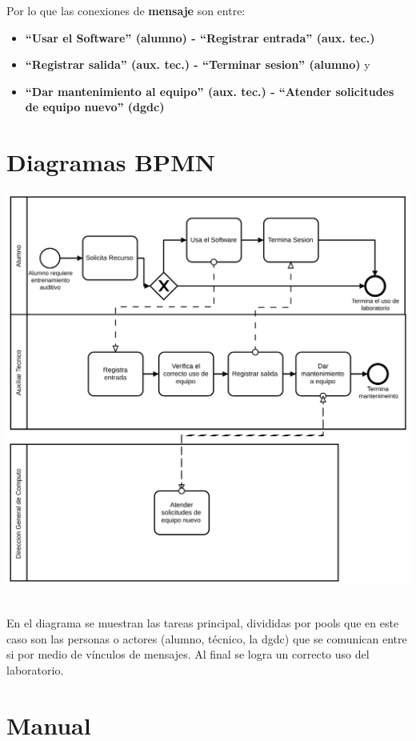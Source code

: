 \documentclass[spanish,12pt,letterpapper]{article}
\begin{document}
	Por lo que las conexiones de \textbf{mensaje} son entre:

	\begin{itemize}
	 \item \textbf{``Usar el Software'' (alumno) - ``Registrar entrada'' (aux. tec.)} 
	 \item \textbf{``Registrar salida'' (aux. tec.) - ``Terminar sesion'' (alumno)} y 
	 \item \textbf{``Dar mantenimiento al equipo'' (aux. tec.) - ``Atender solicitudes de equipo nuevo'' (dgdc)}
	\end{itemize}
	
	\section{Diagramas BPMN}
	\begin{center}
	\includegraphics[width=1\textwidth]{./bpmn}~\\[1cm]
	\end{center}
	
	En el diagrama se muestran las tareas principal, divididas por pools que en este caso son las personas o actores (alumno, técnico, la dgdc) que se comunican entre si por medio de vínculos de mensajes. Al final se logra un correcto uso del laboratorio.
	
	\section{Manual}
\end{document}
